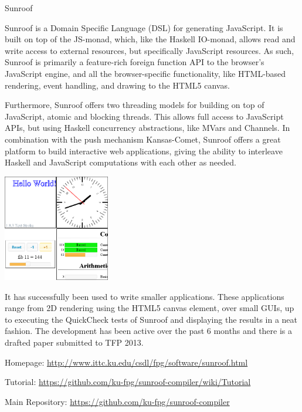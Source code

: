 \begin{hcarentry}{Sunroof}
\label{sunroof}
\makeheader

Sunroof is a Domain Specific Language (DSL) for generating JavaScript.
It is built on top of the JS-monad, which, like the Haskell IO-monad, allows 
read and write access to external resources, but specifically JavaScript
resources. As such, Sunroof is primarily a feature-rich foreign
function API to the browser's JavaScript engine, and all the browser-specific
functionality, like HTML-based rendering, event handling, and 
drawing to the HTML5 canvas. 

Furthermore, Sunroof offers two threading models for 
building on top of JavaScript, atomic and blocking threads.
This allows full access to JavaScript APIs, but
using Haskell concurrency abstractions, like MVars and Channels.
In combination with the push mechanism Kansas-Comet,
Sunroof offers a great platform to build interactive web applications,
giving the ability to interleave Haskell and JavaScript computations
with each other as needed.

\begin{center}
\includegraphics[width=0.35\textwidth]{html/Sunroof-Examples.png}
\end{center}

It has successfully been used to write smaller applications. These
applications range from 2D rendering using the HTML5 canvas element,
over small GUIs, up to executing the QuickCheck tests of Sunroof 
and displaying the results in a neat fashion.
%
The development has been active over the past 6 months and there is
a drafted paper submitted to TFP 2013.

\FurtherReading
\begin{compactitem}
\item Homepage: \url{http://www.ittc.ku.edu/csdl/fpg/software/sunroof.html}
\item Tutorial: \url{https://github.com/ku-fpg/sunroof-compiler/wiki/Tutorial}
\item Main Repository: \url{https://github.com/ku-fpg/sunroof-compiler}
\end{compactitem}
\end{hcarentry}
